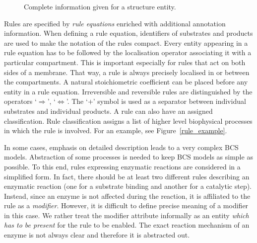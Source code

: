 \documentclass[12pt, twoside]{fithesis2} %
\begin{document}
\begin{figure}[!h]
\begin{center}
\end{center}
\caption{Complete information given for a structure entity.}\label{structure_example}
\end{figure}

Rules are specified by \emph{rule equations} enriched with additional annotation information. When defining a rule equation, identifiers of substrates and products are used to make the notation of the rules compact. Every entity appearing in a rule equation has to be followed by the localisation operator associating it with a particular compartment. This is important especially for rules that act on both sides of a membrane. That way, a rule is always precisely localised in or between the compartments. A natural stoichiometric coefficient can be placed before any entity in a rule equation. Irreversible and reversible rules are distinguished by the operators `$\Rightarrow$', `$\Leftrightarrow$'. The `$+$' symbol is used as a separator between individual substrates and individual products. A rule can also have an assigned classification. Rule classification assigns a list of higher level biophysical processes in which the rule is involved. For an example, see Figure~\ref{rule_example}.

In some cases, emphasis on detailed description leads to a very complex BCS models. Abstraction of some processes is needed to keep BCS models as simple as possible. To this end, rules expressing enzymatic reactions are considered in a simplified form. In fact, there should be at least two different rules describing an enzymatic reaction (one for a substrate binding and another for a catalytic step). Instead, since an enzyme is not affected during the reaction, it is affiliated to the rule as a \emph{modifier}. However, it is difficult to define precise meaning of a modifier in this case. We rather treat the modifier attribute informally as an entity \emph{which has to be present} for the rule to be enabled. The exact reaction mechanism of an enzyme is not always clear and therefore it is abstracted out.
\end{document}
